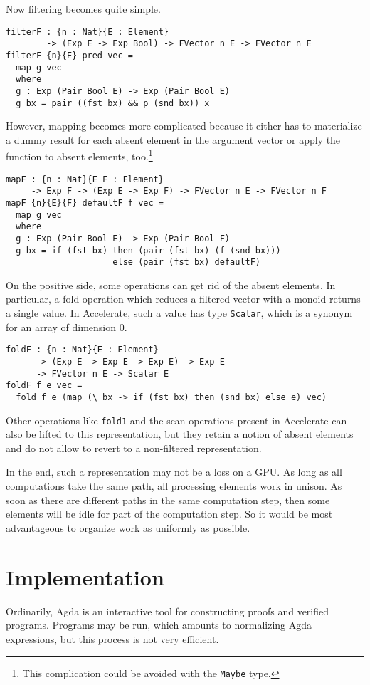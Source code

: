 \documentclass{llncs}
\begin{document}
Now filtering becomes quite simple.
\begin{verbatim}
filterF : {n : Nat}{E : Element}
        -> (Exp E -> Exp Bool) -> FVector n E -> FVector n E
filterF {n}{E} pred vec =
  map g vec
  where
  g : Exp (Pair Bool E) -> Exp (Pair Bool E)
  g bx = pair ((fst bx) && p (snd bx)) x
\end{verbatim}
However, mapping becomes more complicated because it either has to
materialize a dummy result for each absent element in the argument
vector or apply the function to absent elements, too.\footnote{This
  complication could be avoided with the \texttt{Maybe} type.}
\begin{verbatim}
mapF : {n : Nat}{E F : Element}
     -> Exp F -> (Exp E -> Exp F) -> FVector n E -> FVector n F
mapF {n}{E}{F} defaultF f vec =
  map g vec
  where
  g : Exp (Pair Bool E) -> Exp (Pair Bool F)
  g bx = if (fst bx) then (pair (fst bx) (f (snd bx)))
                     else (pair (fst bx) defaultF)
\end{verbatim}
On the positive side, some operations can get rid of the absent
elements. In particular, a fold operation which reduces a filtered
vector with a monoid returns a single value. In Accelerate, such a value has type
\texttt{Scalar}, which is a synonym for an array of dimension $0$.
\begin{verbatim}
foldF : {n : Nat}{E : Element}
      -> (Exp E -> Exp E -> Exp E) -> Exp E
      -> FVector n E -> Scalar E
foldF f e vec =
  fold f e (map (\ bx -> if (fst bx) then (snd bx) else e) vec)
\end{verbatim}
Other operations like \texttt{fold1} and the scan operations present
in Accelerate can also be lifted to this representation, but they
retain a notion of absent elements and do not allow to revert to a
non-filtered representation. 

In the end, such a representation may not be a loss on a GPU. As long
as all computations take the same path, all processing elements work
in unison. As soon as there are different paths in the same
computation step, then some elements will be idle for part of the
computation step. So it would be most advantageous to organize work as
uniformly as possible. 


\section{Implementation}
\label{sec:implementation}

Ordinarily, Agda is an interactive tool for constructing proofs and
verified programs. Programs may be run, which amounts to normalizing
Agda expressions, but this process is not very efficient.
\end{document}
